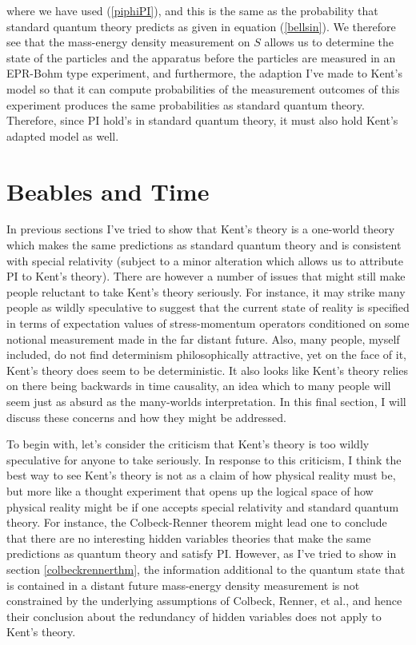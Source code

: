 \documentclass[12pt]{report}
\begin{document}
where we have used (\ref{piphiPI}), and this is the same as the probability that standard quantum theory predicts as given in equation (\ref{bellsin}). We therefore see that the mass-energy density measurement on $S$ allows us to determine the state of the particles and the apparatus before the particles are measured in an EPR-Bohm type experiment, and furthermore, the adaption I've made to Kent's model so that it can compute probabilities of the measurement outcomes of this experiment produces the same probabilities as standard quantum theory. Therefore, since PI hold's in standard quantum theory, it must also hold Kent's adapted model as well.\label{kentpiend}


 
\section{Beables and Time\label{beablesandtime}}
In previous sections I've tried to show that Kent's theory is a one-world theory which makes the same predictions as standard quantum theory and is consistent with special relativity (subject to a minor alteration which allows us to attribute PI to Kent's theory). There are however a number of issues that might still make people reluctant to take Kent's theory seriously. For instance, it may strike many people as wildly speculative to suggest that the current state of reality is specified in terms of expectation values of stress-momentum operators conditioned on some notional measurement made in the far distant future. Also, many people, myself included, do not find determinism philosophically attractive, yet on the face of it, Kent's theory does seem to be deterministic. It also looks like Kent's theory relies on there being backwards in time causality, an idea which to many people will seem just as absurd as the many-worlds interpretation. In this final section, I will discuss these concerns and how they might be addressed. 

To begin with, let's consider the criticism that Kent's theory is too wildly speculative for anyone to take seriously. In response to this criticism, I think the best way to see Kent's theory is not as a claim of how physical reality must be, but more like a thought experiment that opens up the logical space of how physical reality might be if one accepts special relativity and standard quantum theory. For instance, the Colbeck-Renner theorem might lead one to conclude that there are no interesting hidden variables theories that make the same predictions as quantum theory and satisfy PI. However, as I've tried to show in section \ref{colbeckrennerthm}, the information additional to the quantum state that is contained in a distant future mass-energy density measurement is not constrained by the underlying assumptions of Colbeck, Renner, et al., and hence their conclusion about the redundancy of hidden variables does not apply to Kent's theory. 
\end{document}

